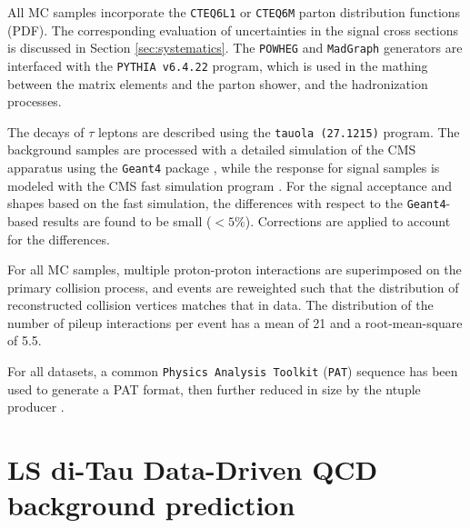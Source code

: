   All MC samples incorporate the \texttt{CTEQ6L1} \cite{Pumplin:2002vw} or \texttt{CTEQ6M} \cite{Nadolsky:2008zw} parton distribution functions (PDF). The corresponding evaluation of uncertainties in the signal cross sections is discussed in Section \ref{sec:systematics}. The \texttt{POWHEG} and \texttt{MadGraph} generators are interfaced with the \texttt{PYTHIA v6.4.22} \cite{Sjostrand:2006za} program, which is used in the mathing between the matrix elements and the parton shower, and the hadronization processes. 
  
  
  The decays of $\tau$ leptons are described using the \texttt{tauola (27.1215)} \cite{Davidson:2010rw} program. The background samples are processed with a detailed simulation of the CMS apparatus using the \texttt{Geant4} package \cite{Agostinelli:2002hh}, while the response for signal samples is modeled with the CMS fast simulation program \cite{Abdullin:2011zz}. For the signal acceptance and \mjj shapes based on the fast simulation, the differences with respect to the \texttt{Geant4}-based results are found to be small ($< 5\%$). Corrections are applied to account for the differences. 
  
  For all MC samples, multiple proton-proton interactions are superimposed on the primary collision process, and events are reweighted such that the distribution of reconstructed collision vertices matches that in data. The distribution of the number of pileup interactions per event has a mean of 21 and a root-mean-square of 5.5. 
  
  For all datasets, a common \texttt{Physics Analysis Toolkit} (\texttt{PAT}) \cite{Adam:2010zza} sequence has been used to generate a PAT format, then further reduced in size by the ntuple producer \cite{bib:thentuplemaker}.



\section {LS di-Tau Data-Driven QCD background prediction} \label{sec:bgestimation}


